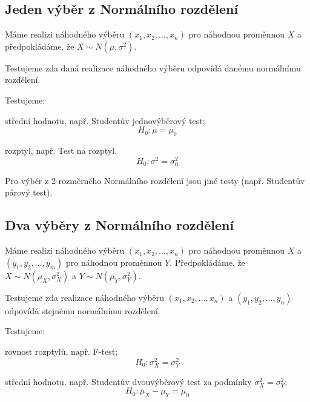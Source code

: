 \subsection{Jeden výběr z Normálního rozdělení}

\begin{compactitem}
    \item Máme realizi náhodného výběru $(x_1, x_2, \ldots, x_n)$ pro náhodnou proměnnou $X$ a předpokládáme, že $X \sim N(\mu, \sigma^2)$.

    \item Testujeme zda daná realizace náhodného výběru odpovídá danému normálnímu rozdělení.

    \item Testujeme: \begin{compactitem}
        \item střední hodnotu, např. Studentův jednovýběrový test;
        $$ H_0 : \mu = \mu_0 $$
        \item rozptyl, např. Test na rozptyl.
        $$ H_0 : \sigma^2 = \sigma_0^2 $$
    \end{compactitem}

    \item Pro výběr z 2-rozměrného Normálního rozdělení jsou jiné testy (např. Studentův párový test).
\end{compactitem}

\subsection{Dva výběry z Normálního rozdělení}

\begin{compactitem}
    \item Máme realizi náhodného výběru $(x_1, x_2, \ldots, x_n)$ pro náhodnou proměnnou $X$ a $(y_1, y_2, \ldots, y_m)$ pro náhodnou proměnnou $Y$. Předpokládáme, že $X \sim N(\mu_X, \sigma_X^2)$ a $Y \sim N(\mu_Y, \sigma_Y^2)$.

    \item Testujeme zda realizace náhodného výběru $(x_1, x_2, \ldots, x_n)$ a $(y_1, y_2, \ldots, y_n)$ odpovídá stejnému normálnímu rozdělení.

    \item Testujeme: \begin{compactitem}
        \item rovnost rozptylů, např. F-test;
        $$ H_0 : \sigma_X^2 = \sigma_Y^2 $$

        \item střední hodnotu, např. Studentův dvouvýběrový test za podmínky $\sigma_X^2 = \sigma_Y^2$;
        $$ H_0 : \mu_X - \mu_Y = \mu_0 $$

    \end{compactitem}
\end{compactitem}

